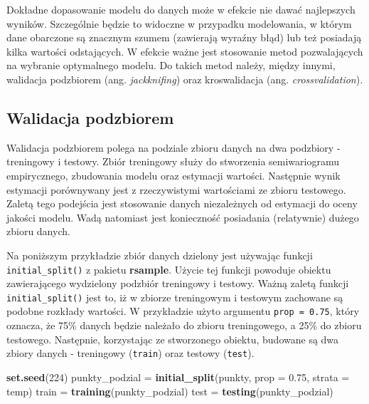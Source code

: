\documentclass[
  paper=6in:9in,pagesize=pdftex,headinclude=on,footinclude=on,10pt]{scrbook}
\newenvironment{Shaded}{\begin{snugshade}}{\end{snugshade}}
\newcommand{\AttributeTok}[1]{\textcolor[rgb]{0.13,0.29,0.53}{#1}}
\newcommand{\DecValTok}[1]{\textcolor[rgb]{0.00,0.00,0.81}{#1}}
\newcommand{\FloatTok}[1]{\textcolor[rgb]{0.00,0.00,0.81}{#1}}
\newcommand{\FunctionTok}[1]{\textcolor[rgb]{0.13,0.29,0.53}{\textbf{#1}}}
\newcommand{\NormalTok}[1]{#1}
\newcommand{\OtherTok}[1]{\textcolor[rgb]{0.56,0.35,0.01}{#1}}
\begin{document}
Dokładne dopasowanie modelu do danych może w efekcie nie dawać najlepszych wyników.
Szczególnie będzie to widoczne w przypadku modelowania, w którym dane obarczone są znacznym szumem (zawierają wyraźny błąd) lub też posiadają kilka wartości odstających.
W efekcie ważne jest stosowanie metod pozwalających na wybranie optymalnego modelu.
Do takich metod należy, między innymi, walidacja podzbiorem (ang. \emph{jackknifing}) oraz kroswalidacja (ang. \emph{crossvalidation}).

\subsection{Walidacja podzbiorem}\label{walidacja-podzbiorem}

Walidacja podzbiorem polega na podziale zbioru danych na dwa podzbiory - treningowy i testowy.
Zbiór treningowy służy do stworzenia semiwariogramu empirycznego, zbudowania modelu oraz estymacji wartości.
Następnie wynik estymacji porównywany jest z rzeczywistymi wartościami ze zbioru testowego.
Zaletą tego podejścia jest stosowanie danych niezależnych od estymacji do oceny jakości modelu.
Wadą natomiast jest konieczność posiadania (relatywnie) dużego zbioru danych.

Na poniższym przykładzie zbiór danych dzielony jest używając funkcji \texttt{initial\_split()} z pakietu \textbf{rsample}.
Użycie tej funkcji powoduje obiektu zawierającego wydzielony podzbiór treningowy i testowy.
Ważną zaletą funkcji \texttt{initial\_split()} jest to, iż w zbiorze treningowym i testowym zachowane są podobne rozkłady wartości.
W przykładzie użyto argumentu \texttt{prop\ =\ 0.75}, który oznacza, że 75\% danych będzie należało do zbioru treningowego, a 25\% do zbioru testowego.
Następnie, korzystając ze stworzonego obiektu, budowane są dwa zbiory danych - treningowy (\texttt{train}) oraz testowy (\texttt{test}).

\begin{Shaded}
\begin{Highlighting}[]
\FunctionTok{set.seed}\NormalTok{(}\DecValTok{224}\NormalTok{)}
\NormalTok{punkty\_podzial }\OtherTok{=} \FunctionTok{initial\_split}\NormalTok{(punkty, }\AttributeTok{prop =} \FloatTok{0.75}\NormalTok{, }\AttributeTok{strata =}\NormalTok{ temp)}
\NormalTok{train }\OtherTok{=} \FunctionTok{training}\NormalTok{(punkty\_podzial)}
\NormalTok{test }\OtherTok{=} \FunctionTok{testing}\NormalTok{(punkty\_podzial)}
\end{Highlighting}
\end{Shaded}
\end{document}
